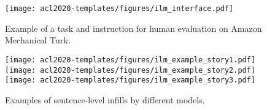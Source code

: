 \begin{figure}[ht]
    \centering
    \texttt{[image: acl2020-templates/figures/ilm\_interface.pdf]}
    \vspace{-3.5cm}
    \caption{Example of a task and instruction for human evaluation on Amazon Mechanical Turk.}\label{fig:amt_example}
\end{figure}

\begin{figure}[h]
\centering
\texttt{[image: acl2020-templates/figures/ilm\_example\_story1.pdf]}
\texttt{[image: acl2020-templates/figures/ilm\_example\_story2.pdf]}
\texttt{[image: acl2020-templates/figures/ilm\_example\_story3.pdf]}
\caption{Examples of sentence-level infills by different models.}\label{fig:more_examples}
\end{figure}
